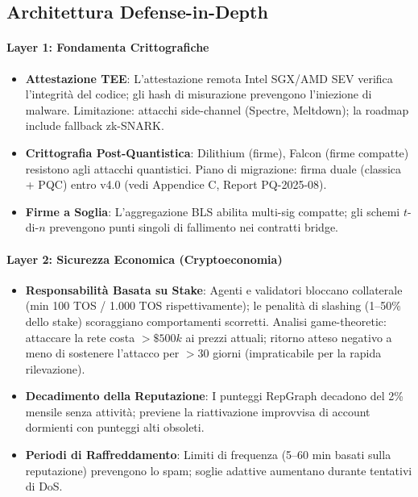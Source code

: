 \documentclass[11pt]{article}
\begin{document}
\begin{itemize}[noitemsep]
\subsection{Architettura Defense-in-Depth}

\paragraph{Layer 1: Fondamenta Crittografiche}
\begin{itemize}[noitemsep]
  \item \textbf{Attestazione TEE}: L'attestazione remota Intel SGX/AMD SEV verifica l'integrità del codice; gli hash di misurazione prevengono l'iniezione di malware. Limitazione: attacchi side-channel (Spectre, Meltdown); la roadmap include fallback zk-SNARK.
  \item \textbf{Crittografia Post-Quantistica}: Dilithium (firme), Falcon (firme compatte) resistono agli attacchi quantistici. Piano di migrazione: firma duale (classica + PQC) entro v4.0 (vedi Appendice C, Report PQ-2025-08).
  \item \textbf{Firme a Soglia}: L'aggregazione BLS abilita multi-sig compatte; gli schemi $t$-di-$n$ prevengono punti singoli di fallimento nei contratti bridge.
\end{itemize}

\paragraph{Layer 2: Sicurezza Economica (Cryptoeconomia)}
\begin{itemize}[noitemsep]
  \item \textbf{Responsabilità Basata su Stake}: Agenti e validatori bloccano collaterale (min 100 TOS / 1.000 TOS rispettivamente); le penalità di slashing (1--50\% dello stake) scoraggiano comportamenti scorretti. Analisi game-theoretic: attaccare la rete costa $>\$500k$ ai prezzi attuali; ritorno atteso negativo a meno di sostenere l'attacco per $>30$ giorni (impraticabile per la rapida rilevazione).
  \item \textbf{Decadimento della Reputazione}: I punteggi RepGraph decadono del 2\% mensile senza attività; previene la riattivazione improvvisa di account dormienti con punteggi alti obsoleti.
  \item \textbf{Periodi di Raffreddamento}: Limiti di frequenza (5--60 min basati sulla reputazione) prevengono lo spam; soglie adattive aumentano durante tentativi di DoS.
\end{itemize}


\end{itemize}
\end{document}
